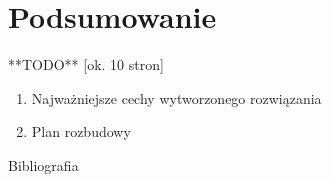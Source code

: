 \clearpage
\section{Podsumowanie}

**TODO** [ok. 10 stron]

\begin{enumerate}
    \item Najważniejsze cechy wytworzonego rozwiązania
    \item Plan rozbudowy
\end{enumerate}

    Bibliografia